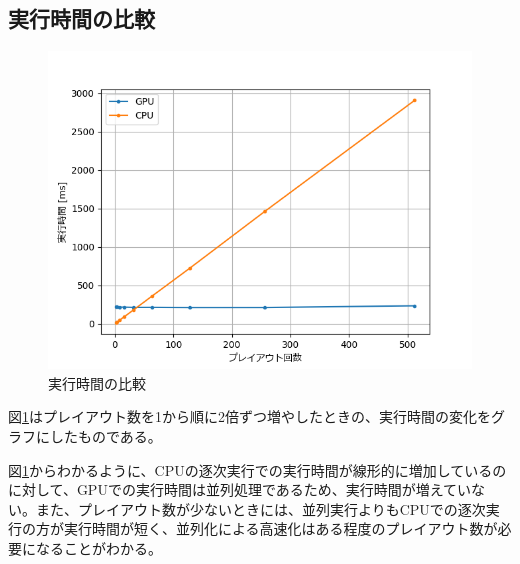 \documentclass[10pt, a4paper]{jsarticle}
\begin{document}
\subsection{実行時間の比較}
\begin{figure}[ht]
    \begin{center}
        \includegraphics[width=12cm]{img/gpu_cpu_time.png}
        \caption{実行時間の比較}
        \label{fig:cpu_gpu_time}
    \end{center}
\end{figure}
\par 図\ref{fig:cpu_gpu_time}はプレイアウト数を1から順に2倍ずつ増やしたときの、実行時間の変化をグラフにしたものである。
\par 図\ref{fig:cpu_gpu_time}からわかるように、CPUの逐次実行での実行時間が線形的に増加しているのに対して、GPUでの実行時間は並列処理であるため、実行時間が増えていない。また、プレイアウト数が少ないときには、並列実行よりもCPUでの逐次実行の方が実行時間が短く、並列化による高速化はある程度のプレイアウト数が必要になることがわかる。
\end{document}
